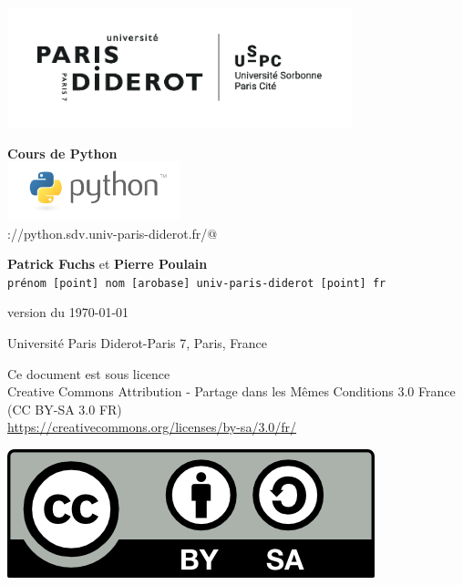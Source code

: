 \documentclass[a4paper,11pt,twoside]{book}
\date{}
\begin{document}
\thispagestyle{empty}

\begin{titlepage}
\begin{center}

\includegraphics[width=10cm]{img/LogoUPD_USPC.png}

\vspace{3cm}

{\Huge \bf Cours de Python}\\
\includegraphics[width=5cm]{img/logo_python.png} \\
\verb@https://python.sdv.univ-paris-diderot.fr/@
\vspace{2cm}

{\large
	{\bf Patrick Fuchs} et {\bf Pierre Poulain} \\
	{\tt prénom [point] nom [arobase] univ-paris-diderot [point] fr}
}

\vspace{3 cm}

version du \today

\vspace{3cm}
Université Paris Diderot-Paris 7, Paris, France

\vfill

\begin{minipage}{0.80\textwidth}
\footnotesize
Ce document est sous licence \\
Creative Commons Attribution - Partage dans les Mêmes Conditions 3.0 France \\
(CC BY-SA 3.0 FR) \\
\url{https://creativecommons.org/licenses/by-sa/3.0/fr/}
\end{minipage}
\begin{minipage}{0.15\textwidth}
\includegraphics{img/logo_CC-BY-SA.png}
\end{minipage}

\end{center}
\end{titlepage}
\end{document}
